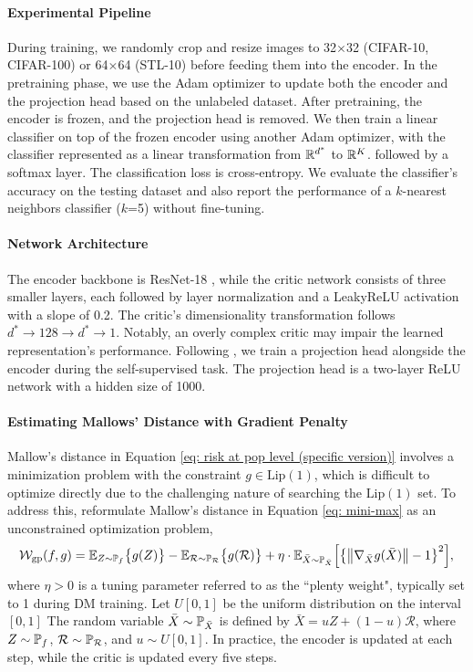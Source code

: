 \paragraph{Experimental Pipeline}
During training, we randomly crop and resize images to 32$\times$32 (CIFAR-10, CIFAR-100) or 64$\times$64 (STL-10) before feeding them into the encoder. In the pretraining phase, we use the Adam optimizer to update both the encoder and the projection head based on the unlabeled dataset. After pretraining, the encoder is frozen, and the projection head is removed. We then train a linear classifier on top of the frozen encoder using another Adam optimizer, with the classifier represented as a linear transformation from $\R^{d^*}$ to $\R^K$.  followed by a softmax layer. The classification loss is cross-entropy. We evaluate the classifier's accuracy on the testing dataset and also report the performance of a $k$-nearest neighbors classifier ($k$=5) without fine-tuning.

\paragraph{Network Architecture}
The encoder backbone is ResNet-18 \citep{he2016resent}, while the critic network consists of three smaller layers, each followed by layer normalization \citep{ba2016layernormalization} and a LeakyReLU activation with a slope of 0.2. The critic's dimensionality transformation follows $d^* \to 128 \to d^* \to 1$. Notably, an overly complex critic may impair the learned representation's performance. Following \citet{chen2020simclr}, we train a projection head alongside the encoder during the self-supervised task. The projection head is a two-layer ReLU network with a hidden size of 1000.

\paragraph{Estimating Mallows' Distance with Gradient Penalty}
Mallow's distance in Equation \eqref{eq: risk at pop level (specific version)} involves a minimization problem with the constraint $g \in \mathrm{Lip}(1)$, which is difficult to optimize directly due to the challenging nature of searching the $\mathrm{Lip}(1)$ set. To address this, \citet{gulrajani2017wgangp} reformulate Mallow's distance in Equation \eqref{eq: mini-max} as an unconstrained optimization problem,
\begin{align}\label{eq: gp}
    \mathcal{W}_{\mathrm{gp}}(f, g) = \E_{Z \sim \P_f} \big\{g(Z)\big\} - \E_{\mathcal{R} \sim \P_\mathcal{R}} \big\{g(\mathcal{R})\big\} + \eta \cdot \E_{\bar{X} \sim \P_{\bar{X}}} \Big[\big\{\big\Vert\nabla_{\bar{X}}g(\bar{X}) \big\Vert - 1\big\}^2\Big],
\end{align}
where $\eta > 0$ is a tuning parameter referred to as the ``plenty weight", typically set to 1 during DM training. Let $U[0,1]$ be the uniform distribution on the interval $[0,1]$ The random variable $\bar{X}\sim \P_{\bar{X}}$ is defined by $\bar{X} = uZ + (1 - u)\mathcal{R}$, where $Z \sim \P_f$, $\mathcal{R} \sim \P_\mathcal{R}$, and $u \sim U[0,1]$. In practice, the encoder is updated at each step, while the critic is updated every five steps.

